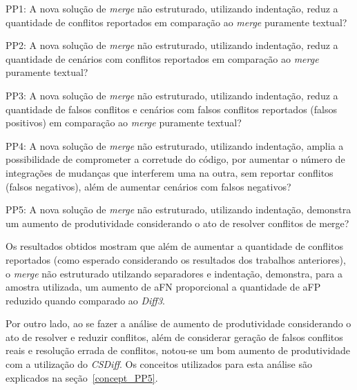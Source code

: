 \begin{compactenum}[1)]
	\item PP1: A nova solução de \emph{merge} não estruturado, utilizando indentação,
	reduz a quantidade de conflitos reportados em comparação ao \emph{merge} puramente textual?
	\item PP2: A nova solução de \emph{merge} não estruturado, utilizando indentação,
	reduz a quantidade de cenários com conflitos reportados em comparação ao \emph{merge} puramente textual?
	\item PP3: A nova solução de \emph{merge} não estruturado, utilizando indentação,
	reduz a quantidade de falsos conflitos e cenários com falsos conflitos reportados
	(falsos positivos) em comparação ao \emph{merge} puramente textual?
	\item PP4: A nova solução de \emph{merge} não estruturado, utilizando indentação,
	amplia a possibilidade de comprometer a corretude do código, por aumentar o número de
	integrações de mudanças que interferem uma na outra, sem reportar conflitos (falsos negativos),
	além de aumentar cenários com falsos negativos?
	\item PP5: A nova solução de \emph{merge} não estruturado, utilizando indentação,
	demonstra um aumento de produtividade considerando o ato de resolver conflitos de merge?
\end{compactenum}

Os resultados obtidos mostram que além de aumentar a quantidade de conflitos
reportados (como esperado considerando os resultados dos trabalhos anteriores),
o \emph{merge} não estruturado utilzando separadores e indentação, demonstra,
para a amostra utilizada, um aumento de aFN proporcional a quantidade de aFP
reduzido quando comparado ao \emph{Diff3}.

Por outro lado, ao se fazer a análise de aumento de produtividade considerando
o ato de resolver e reduzir conflitos, além de considerar geração de falsos
conflitos reais e resolução errada de conflitos, notou-se um bom aumento de
produtividade com a utilização do \emph{CSDiff}. Os conceitos utilizados para
esta análise são explicados na seção~\ref{concept_PP5}.

